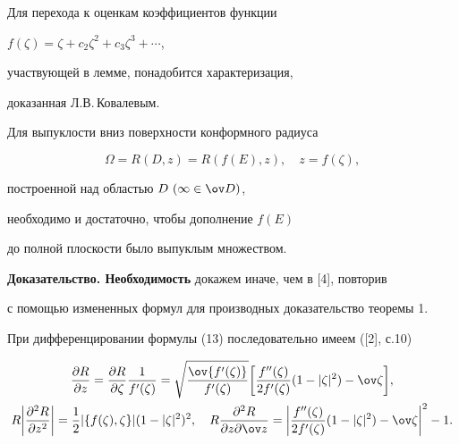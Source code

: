  


 


Для перехода к оценкам коэффициентов функции 


$f(\zeta)=\zeta+c_2\zeta^2+c_3\zeta^3+\dotsb$, 


участвующей в лемме, понадобится характеризация, 


доказанная Л.В.\,Ковалевым. 


 


 


\begin{thm} 


Для выпуклости вниз поверхности конформного радиуса 


\begin{equation} 


\Omega=R(D,z)=R(f(E),z),\quad z=f(\zeta), 


\end{equation} 


построенной над областью $D\ (\infty\in\ov D)$, 


необходимо и достаточно, чтобы дополнение $f(E)$ 


до полной плоскости было выпуклым множеством. 


\end{thm} 


 


{\bf Доказательство. Необходимость} докажем иначе, чем в [4], повторив 


с помощью измененных формул для производных доказательство теоремы 1. 


 


При дифференцировании формулы (13) последовательно имеем ([2], с.10) 


\begin{gather*} 


\frac{\partial R}{\partial z}=\frac{\partial R}{\partial\zeta} 


\frac{1}{f'(\zeta)}= 


\sqrt{\frac{\ov{f'(\zeta)}}{f'(\zeta)}}\bigg[ 


\frac{f''(\zeta)}{2f'(\zeta)}(1-|\zeta|^2)-\ov\zeta\bigg],\\ 


% 


R\bigg|\frac{\partial^2R}{\partial z^2}\bigg|=\frac{1}{2} 


|\{f(\zeta),\zeta\}|(1-|\zeta|^2)^2,\quad 


R\frac{\partial^2R}{\partial z\partial\ov z}=\bigg| 


\frac{f''(\zeta)}{2f'(\zeta)}(1-|\zeta|^2)-\ov\zeta 


\bigg|^2-1. 


\end{gather*} 


